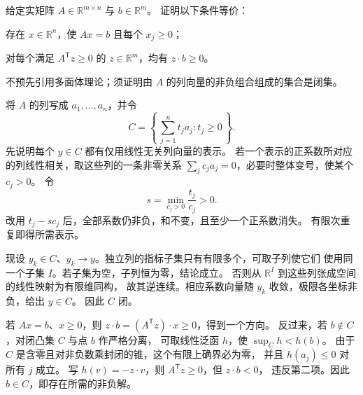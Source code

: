 \begin{exercise}\label{b1:ex:C1-finite-inequality-alternative}
给定实矩阵 \(A\in\mathbb R^{m\times n}\) 与 \(b\in\mathbb R^m\)。
证明以下条件等价：
\begin{equivalences}
\item\label{b1:item:C1-positive-solution}存在 \(x\in\mathbb R^n\)，使 \(Ax=b\) 且每个 \(x_j\geq0\)；
\item\label{b1:item:C1-positive-test}对每个满足 \(A^{\mathsf T}z\geq0\) 的 \(z\in\mathbb R^m\)，均有 \(z\cdot b\geq0\)。
\end{equivalences}
不预先引用多面体理论；须证明由 \(A\) 的列向量的非负组合组成的集合是闭集。
\end{exercise}
\begin{solution}
将 \(A\) 的列写成 \(a_1,\ldots,a_n\)，并令
\[
 C=\left\{\,\sum_{j=1}^nt_ja_j:t_j\geq0\,\right\}.
\]
先说明每个 \(y\in C\) 都有仅用线性无关列向量的表示。
若一个表示的正系数所对应的列线性相关，取这些列的一条非零关系
\(\sum_jc_ja_j=0\)，必要时整体变号，使某个 \(c_j>0\)。
令
\[
 s=\min_{c_j>0}\frac{t_j}{c_j}>0.
\]
改用 \(t_j-sc_j\) 后，全部系数仍非负，和不变，且至少一个正系数消失。
有限次重复即得所需表示。

现设 \(y_k\in C\)、\(y_k\to y\)。独立列的指标子集只有有限多个，可取子列使它们
使用同一个子集 \(I\)。若子集为空，子列恒为零，结论成立。
否则从 \(\mathbb R^{I}\) 到这些列张成空间的线性映射为有限维同构，
故其逆连续。相应系数向量随 \(y_k\) 收敛，极限各坐标非负，给出 \(y\in C\)。
因此 \(C\) 闭。

若 \(Ax=b\)、\(x\geq0\)，则
\(z\cdot b=(A^{\mathsf T}z)\cdot x\geq0\)，得到一个方向。
反过来，若 \(b\notin C\)，对闭凸集 \(C\) 与点 \(b\) 作严格分离，
可取线性泛函 \(h\)，使 \(\sup_Ch<h(b)\)。
由于 \(C\) 是含零且对非负数乘封闭的锥，这个有限上确界必为零，
并且 \(h(a_j)\leq0\) 对所有 \(j\) 成立。
写 \(h(v)=-z\cdot v\)，则 \(A^{\mathsf T}z\geq0\)，但 \(z\cdot b<0\)，
违反第二项。因此 \(b\in C\)，即存在所需的非负解。
\end{solution}
